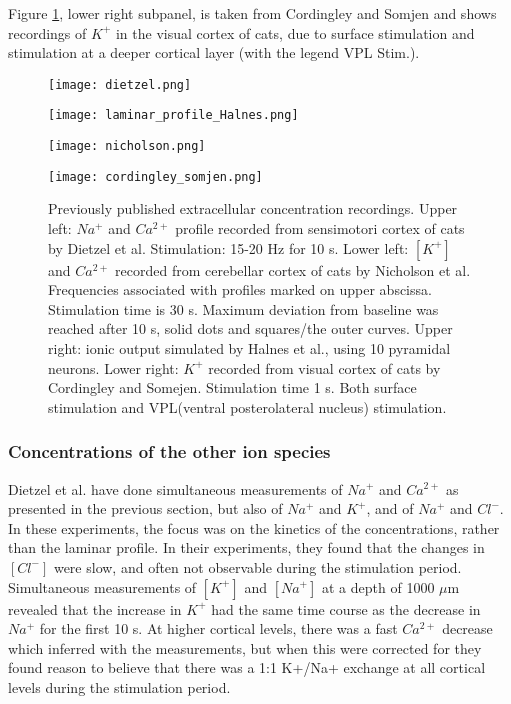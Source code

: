 \documentclass{article}
\begin{document}
Figure \ref{fig:data sets}, lower right subpanel, is taken from Cordingley and Somjen \cite{CordingleySomjen} and shows recordings of $K^+$ in the visual cortex of cats, due to surface stimulation and stimulation at a deeper cortical layer (with the legend VPL Stim.). 
\begin{figure}[!tbp]
  \centering
  \begin{minipage}[b]{0.45\textwidth}
    \texttt{[image: dietzel.png]}
  \end{minipage}
  \hfill
  \begin{minipage}[b]{0.45\textwidth}
    \texttt{[image: laminar\_profile\_Halnes.png]}
  \end{minipage}
    \begin{minipage}[b]{0.45\textwidth}
    \texttt{[image: nicholson.png]}
  \end{minipage}
  \hfill
  \begin{minipage}[b]{0.45\textwidth}
    \texttt{[image: cordingley\_somjen.png]}
  \end{minipage}
  \caption{Previously published extracellular concentration recordings. Upper left: $Na^+$ and $Ca^{2+}$ profile recorded from sensimotori cortex of cats by Dietzel et al. Stimulation: 15-20 Hz for 10 s. Lower left: $[K^+]$ and $Ca^{2+}$  recorded from cerebellar cortex of cats by Nicholson et al. Frequencies associated with profiles marked on upper abscissa. Stimulation time is 30 s. Maximum deviation from baseline was reached after 10 s, solid dots and squares/the outer curves. Upper right: ionic output simulated by Halnes et al., using 10 pyramidal neurons. Lower right: $K^+$ recorded from visual cortex of cats by Cordingley and Somejen. Stimulation time 1 s. Both surface stimulation and VPL(ventral posterolateral nucleus) stimulation.
}
  \label{fig:data sets}
\end{figure} 



\subsubsection{Concentrations of the other ion species}
 Dietzel et al. \cite{Dietzel1982} have done simultaneous measurements of $Na^+$ and $Ca^{2+}$ as presented in the previous section, but also of $Na^+$ and $K^{+}$, and of $Na^+$ and $Cl^{-}$. In these experiments, the focus was on the kinetics of the concentrations, rather than the laminar profile. In their experiments, they found that the changes in $[Cl^-]$ were slow, and often not observable during the stimulation period. Simultaneous measurements of $[K^+]$ and $[Na^+]$ at a depth of 1000 $\mu$m revealed that the increase in $K^+$ had the same time course as the decrease in $Na^+$ for the first 10 s. At higher cortical levels, there was a fast $Ca^{2+}$ decrease which inferred with the measurements, but when this were corrected for they found reason to believe that there was a 1:1 K+/Na+ exchange at all cortical levels during the stimulation period. 
 
\end{document}

